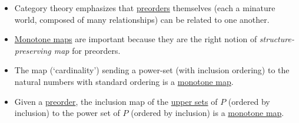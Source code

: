 \begin{itemize}
    \item Category theory emphasizes that \href{doc/1 math/Seven Sketches in Compositionality/1 Chapter 1: Generative Effects/Preorders/Preorder}{preorders} themselves (each a minature world, composed of many relationships) can be related to one another.
    \item \href{doc/1 math/Seven Sketches in Compositionality/1 Chapter 1: Generative Effects/4 Monotone maps/Monotone map}{Monotone maps} are important because they are the right notion of \emph{structure-preserving map} for preorders.
    \item The map (`cardinality') sending a power-set (with inclusion ordering) to the natural numbers with standard ordering is a \href{doc/1 math/Seven Sketches in Compositionality/1 Chapter 1: Generative Effects/4 Monotone maps/Monotone map}{monotone map}.
    \item Given a \href{doc/1 math/Seven Sketches in Compositionality/1 Chapter 1: Generative Effects/Preorders/Preorder}{preorder}, the inclusion map of the \href{doc/1 math/Seven Sketches in Compositionality/1 Chapter 1: Generative Effects/3 Preorders/Upper set}{upper sets} of $P$ (ordered by inclusion) to the power set of $P$ (ordered by inclusion) is a \href{doc/1 math/Seven Sketches in Compositionality/1 Chapter 1: Generative Effects/4 Monotone maps/Monotone map}{monotone map}.

  \end{itemize}